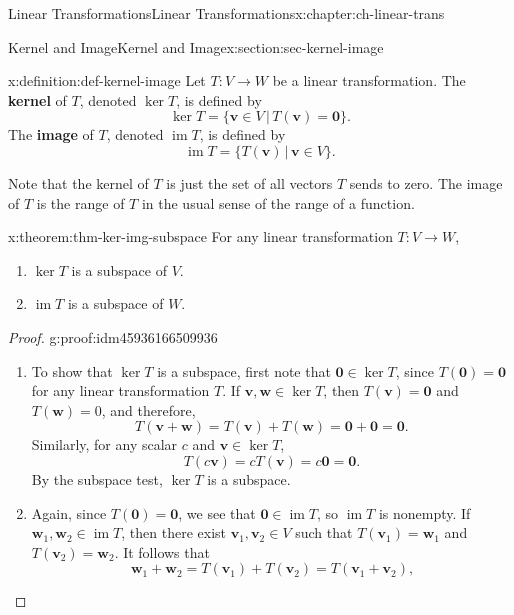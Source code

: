 \documentclass[oneside,10pt,]{book}
\newcommand{\terminology}[1]{\textbf{#1}}
\numberwithin{equation}{section}
\newcommand{\im}{\operatorname{im}}
\newcommand{\vv}{\mathbf{v}}
\newcommand{\ww}{\mathbf{w}}
\begin{document}
\begin{chapterptx}{Linear Transformations}{}{Linear Transformations}{}{}{x:chapter:ch-linear-trans}
\begin{sectionptx}{Kernel and Image}{}{Kernel and Image}{}{}{x:section:sec-kernel-image}
\begin{definition}{}{x:definition:def-kernel-image}%
Let \(T:V\to W\) be a linear transformation. The \terminology{kernel} of \(T\), denoted \(\ker T\), is defined by%
\begin{equation*}
\ker T = \{\vv\in V \,|\, T(\vv)=\mathbf{0}\}\text{.}
\end{equation*}
The \terminology{image} of \(T\), denoted \(\im T\), is defined by%
\begin{equation*}
\im T = \{T(\vv) \,|\, \vv\in V\}\text{.}
\end{equation*}
%
\end{definition}
Note that the kernel of \(T\) is just the set of all vectors \(T\) sends to zero. The image of \(T\) is the range of \(T\) in the usual sense of the range of a function.%
\begin{theorem}{}{}{x:theorem:thm-ker-img-subspace}%
For any linear transformation \(T:V\to W\),%
\begin{enumerate}
\item{}\(\ker T\) is a subspace of \(V\).%
\item{}\(\im T\) is a subspace of \(W\).%
\end{enumerate}
%
\end{theorem}
\begin{proof}{}{g:proof:idm45936166509936}
%
\begin{enumerate}
\item{}To show that \(\ker T\) is a subspace, first note that \(\mathbf{0}\in \ker T\), since \(T(\mathbf{0})=\mathbf{0}\) for any linear transformation \(T\). If \(\vv,\ww\in \ker T\), then \(T(\vv)=\mathbf{0}\) and \(T(\ww)=0\), and therefore,%
\begin{equation*}
T(\vv+\ww)=T(\vv)+T(\ww)=\mathbf{0}+\mathbf{0}=\mathbf{0}\text{.}
\end{equation*}
Similarly, for any scalar \(c\) and \(\vv\in \ker T\),%
\begin{equation*}
T(c\vv)=cT(\vv)=c\mathbf{0}=\mathbf{0}\text{.}
\end{equation*}
By the subspace test, \(\ker T\) is a subspace.%
\item{}Again, since \(T(\mathbf{0})=\mathbf{0}\), we see that \(\mathbf{0}\in \im T\), so \(\im T\) is nonempty. If \(\ww_1,\ww_2\in \im T\), then there exist \(\vv_1,\vv_2\in V\) such that \(T(\vv_1)=\ww_1\) and \(T(\vv_2)=\ww_2\). It follows that%
\begin{equation*}
\ww_1+\ww_2 = T(\vv_1)+T(\vv_2) = T(\vv_1+\vv_2)\text{,}
\end{equation*}

\end{enumerate}
\end{proof}
\end{sectionptx}
\end{chapterptx}
\end{document}
